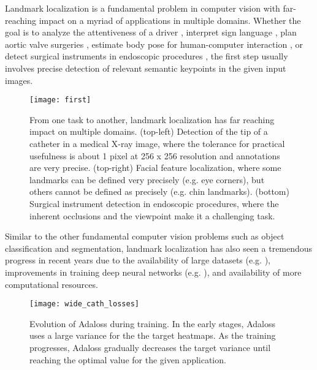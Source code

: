 \documentclass[10pt,twocolumn,letterpaper]{article}
\begin{document}
Landmark localization is a fundamental problem in computer vision with far-reaching impact on a myriad of applications in multiple domains. Whether the goal is to analyze the attentiveness of a driver \cite{jabon2011}, interpret sign language \cite{Grzejszczak2016MTA}, plan aortic valve surgeries \cite{zheng2010}, estimate body pose for human-computer interaction \cite{shotton13pami}, or detect surgical instruments in endoscopic procedures \cite{du2018}, the first step usually involves precise detection of relevant semantic keypoints in the given input images.

\begin{figure}[t!]
\centering
\texttt{[image: first]}
  \caption{From one task to another, landmark localization has far reaching impact on multiple domains. (top-left) Detection of the tip of a catheter in a medical X-ray image, where the tolerance for practical usefulness is about 1 pixel at 256 x 256 resolution and annotations are very precise. (top-right) Facial feature localization, where some landmarks can be defined very precisely (e.g. eye corners), but others cannot be defined as precisely (e.g. chin landmarks). (bottom) Surgical instrument detection in endoscopic procedures, where the inherent occlusions and the viewpoint make it a challenging task. 
  }
  \label{fig:first}
\end{figure}

Similar to the other fundamental computer vision problems such as object classification and segmentation, landmark localization has also seen a tremendous progress in recent years due to the availability of large datasets (e.g. \cite{300w,du2018,afw,mpii,flic}), improvements in training deep neural networks (e.g. \cite{unet,batchnorm,kingma2015,relu}), and availability of more  computational resources. 

\begin{figure*}[ht!]
  \begin{center}
    \centering
    \texttt{[image: wide\_cath\_losses]}
	\caption{Evolution of Adaloss during training. In the early
          stages, Adaloss uses a large variance for the
          the target heatmaps. As the training progresses, Adaloss
          gradually decreases the target variance until reaching
          the optimal value for the given application.}
	\label{fig:evol_cath_loss}
  \end{center}
\end{figure*}
\end{document}
